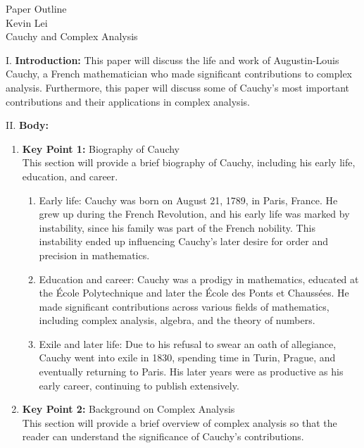 \documentclass[11pt]{article}
\begin{document}
\begin{center}
    Paper Outline \\
    Kevin Lei \\
    Cauchy and Complex Analysis
\end{center}
\noindent I. \textbf{Introduction: } This paper will discuss the life and work of Augustin-Louis Cauchy, a French mathematician who made significant contributions to complex analysis.
Furthermore, this paper will discuss some of Cauchy's most important contributions and their applications in complex analysis.

\vspace{0.1in}

\noindent II. \textbf{Body: } 

\begin{enumerate}[label=\Alph*.]
    \item \textbf{Key Point 1: }Biography of Cauchy \\
    This section will provide a brief biography of Cauchy, including his early life, education, and career.
    \begin{enumerate}[label=\arabic*.]
        \item Early life: Cauchy was born on August 21, 1789, in Paris, France. He grew up during the French Revolution, and his early life was marked by instability, since his family was part of the French nobility. This instability ended up influencing Cauchy's later desire for order and precision in mathematics. \cite{Belhoste1991}
        \item Education and career: Cauchy was a prodigy in mathematics, educated at the École Polytechnique and later the École des Ponts et Chaussées. He made significant contributions across various fields of mathematics, including complex analysis, algebra, and the theory of numbers. \cite{Belhoste1991}
        \item Exile and later life: Due to his refusal to swear an oath of allegiance, Cauchy went into exile in 1830, spending time in Turin, Prague, and eventually returning to Paris. His later years were as productive as his early career, continuing to publish extensively. \cite{Belhoste1991}
    \end{enumerate}
    \item \textbf{Key Point 2: }Background on Complex Analysis \\
    This section will provide a brief overview of complex analysis so that the reader can understand the significance of Cauchy's contributions.
    \begin{enumerate}[label=\arabic*.]

\end{enumerate}
\end{enumerate}
\end{document}
